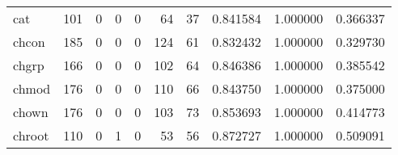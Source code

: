 \begin{longtable}{lrrrrrrrrr}
cat       &                                   101 &                                                  0 &                                                  0 &                                                  0 &                                                 64 &                                                 37 &                                           0.841584 &                               1.000000 &                             0.366337 \\
chcon     &                                   185 &                                                  0 &                                                  0 &                                                  0 &                                                124 &                                                 61 &                                           0.832432 &                               1.000000 &                             0.329730 \\
chgrp     &                                   166 &                                                  0 &                                                  0 &                                                  0 &                                                102 &                                                 64 &                                           0.846386 &                               1.000000 &                             0.385542 \\
chmod     &                                   176 &                                                  0 &                                                  0 &                                                  0 &                                                110 &                                                 66 &                                           0.843750 &                               1.000000 &                             0.375000 \\
chown     &                                   176 &                                                  0 &                                                  0 &                                                  0 &                                                103 &                                                 73 &                                           0.853693 &                               1.000000 &                             0.414773 \\
chroot    &                                   110 &                                                  0 &                                                  1 &                                                  0 &                                                 53 &                                                 56 &                                           0.872727 &                               1.000000 &                             0.509091 \\

\end{longtable}
